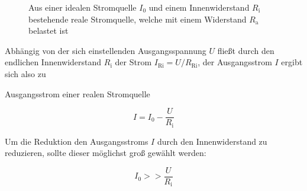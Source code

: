 \begin{frame}
{\begin{figure}[h!]
				\caption{Aus einer idealen Stromquelle $I_0$ und einem Innenwiderstand $R_\mathrm{i}$ bestehende reale Stromquelle, welche mit einem Widerstand $R_\mathrm{a}$ belastet ist}
				\label{fig:stromq}
		
		\end{figure}


		Abhängig von der sich einstellenden Ausgangsspannung $U$ fließt durch den endlichen Innenwiderstand 
		$R_\mathrm{i}$ der Strom $I_\mathrm{Ri} = U / R_\mathrm{Ri}$, der Ausgangsstrom $I$ ergibt 
		sich also zu

		\begin{Merksatz}{Ausgangsstrom einer realen Stromquelle}

			\begin{equation*}
			I = I_0 - \frac{U}{R_\mathrm{i}}
			\end{equation*}

		\end{Merksatz}

		Um die Reduktion den Ausgangsstroms $I$ durch den Innenwiderstand zu reduzieren, sollte dieser möglichst groß gewählt werden:

		\begin{equation*}
			I_0 >> \frac{U}{R_\mathrm{i}}
		\end{equation*}

		
		
	}






\end{frame}
